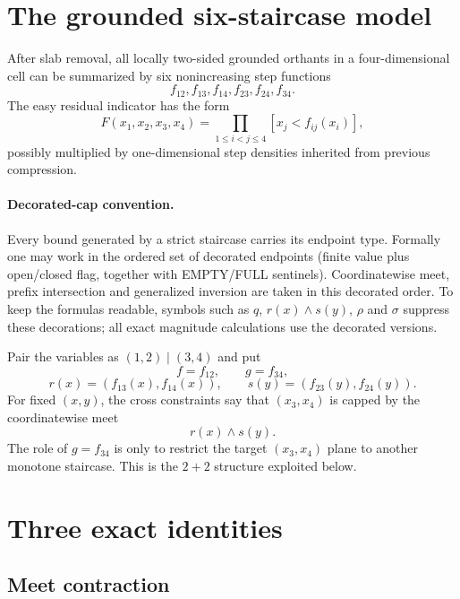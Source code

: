 \documentclass[12pt,a4paper]{article}
\theoremstyle{definition}
\newcommand{\1}{\mathbf 1}
\newcommand{\meet}{\wedge}
\begin{document}
\section{The grounded six-staircase model}

After slab removal, all locally two-sided grounded orthants in a four-dimensional cell can be summarized by six nonincreasing step functions
\[
f_{12},f_{13},f_{14},f_{23},f_{24},f_{34}.
\]
The easy residual indicator has the form
\begin{equation}
F(x_1,x_2,x_3,x_4)
 =\prod_{1\le i<j\le4}[x_j< f_{ij}(x_i)],                  \label{eq:six}
\end{equation}
possibly multiplied by one-dimensional step densities inherited from previous compression.

\paragraph{Decorated-cap convention.}
Every bound generated by a strict staircase carries its endpoint type.  Formally one may work in the ordered set of decorated endpoints (finite value plus open/closed flag, together with EMPTY/FULL sentinels).  Coordinatewise meet, prefix intersection and generalized inversion are taken in this decorated order.  To keep the formulas readable, symbols such as $q$, $r(x)\wedge s(y)$, $\rho$ and $\sigma$ suppress these decorations; all exact magnitude calculations use the decorated versions.

Pair the variables as $(1,2)\mid(3,4)$ and put
\[
f=f_{12},\qquad g=f_{34},
\]
\[
r(x)=(f_{13}(x),f_{14}(x)),\qquad
s(y)=(f_{23}(y),f_{24}(y)).
\]
For fixed $(x,y)$, the cross constraints say that $(x_3,x_4)$ is capped by the coordinatewise meet
\[
r(x)\meet s(y).
\]
The role of $g=f_{34}$ is only to restrict the target $(x_3,x_4)$ plane to another monotone staircase. This is the $2+2$ structure exploited below.

\section{Three exact identities}

\subsection{Meet contraction}
\end{document}
